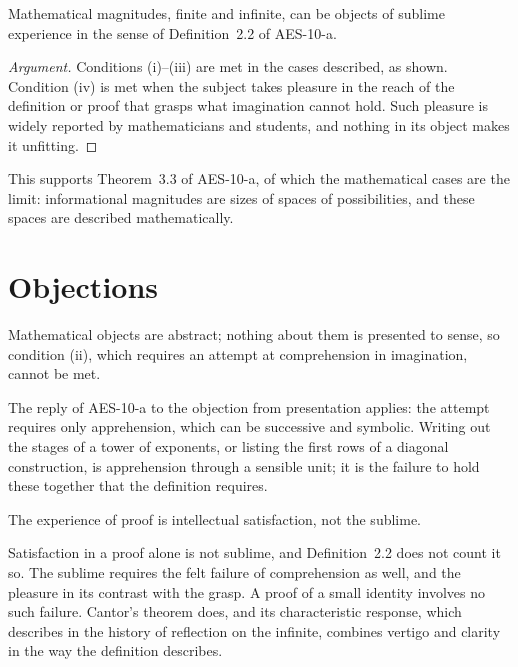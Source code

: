\documentclass{situationist-preprint}
\begin{document}
\begin{proposition}\label{p:math}
Mathematical magnitudes, finite and infinite, can be objects of sublime experience in the sense of Definition~2.2 of AES-10-a.
\end{proposition}

\begin{proof}[Argument]
Conditions (i)--(iii) are met in the cases described, as shown. Condition (iv) is met when the subject takes pleasure in the reach of the definition or proof that grasps what imagination cannot hold. Such pleasure is widely reported by mathematicians and students, and nothing in its object makes it unfitting.
\end{proof}

This supports Theorem~3.3 of AES-10-a, of which the mathematical cases are the limit: informational magnitudes are sizes of spaces of possibilities, and these spaces are described mathematically.

\section{Objections}

\begin{objection}
Mathematical objects are abstract; nothing about them is presented to sense, so condition (ii), which requires an attempt at comprehension in imagination, cannot be met.
\end{objection}

\begin{reply}
The reply of AES-10-a to the objection from presentation applies: the attempt requires only apprehension, which can be successive and symbolic. Writing out the stages of a tower of exponents, or listing the first rows of a diagonal construction, is apprehension through a sensible unit; it is the failure to hold these together that the definition requires.
\end{reply}

\begin{objection}
The experience of proof is intellectual satisfaction, not the sublime.
\end{objection}

\begin{reply}
Satisfaction in a proof alone is not sublime, and Definition~2.2 does not count it so. The sublime requires the felt failure of comprehension as well, and the pleasure in its contrast with the grasp. A proof of a small identity involves no such failure. Cantor's theorem does, and its characteristic response, which \citet{Moore2001} describes in the history of reflection on the infinite, combines vertigo and clarity in the way the definition describes.
\end{reply}
\end{document}
